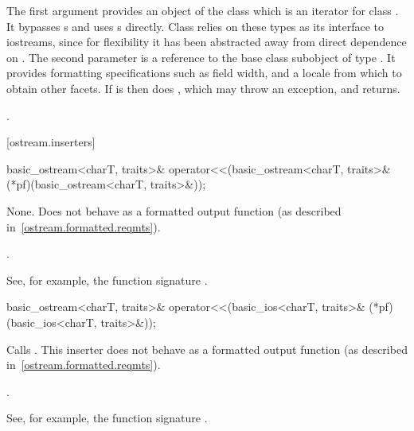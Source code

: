 \begin{itemdescr}
\pnum
The first argument provides an object of the
class which is an iterator for class .
It bypasses
s
and uses
s
directly.
Class
relies on these types as its
interface to iostreams, since for flexibility it has been abstracted
away from direct dependence on
.
The second parameter is a reference to the base class subobject of type
.
It provides formatting specifications such as field width, and
a locale from which to obtain other facets.
If
is
then does
,
which may throw an exception, and returns.

\pnum
\returns
{}.
\end{itemdescr}

[ostream.inserters]{}

%
\begin{itemdecl}
basic_ostream<charT, traits>&
  operator<<(basic_ostream<charT, traits>& (*pf)(basic_ostream<charT, traits>&));
\end{itemdecl}

\begin{itemdescr}
\pnum
\effects
None.
Does not behave as a formatted output function (as described
in~\ref{ostream.formatted.reqmts}).

\pnum
\returns
{}.
\begin{footnote}
See, for example, the function signature
%
.
\end{footnote}
\end{itemdescr}

%
\begin{itemdecl}
basic_ostream<charT, traits>&
  operator<<(basic_ios<charT, traits>& (*pf)(basic_ios<charT, traits>&));
\end{itemdecl}

\begin{itemdescr}
\pnum
\effects
Calls
.
This inserter does not
behave as a formatted output function (as described in~\ref{ostream.formatted.reqmts}).

\pnum
\returns
{}.
\begin{footnote}
See, for example, the function signature
%
.
\end{footnote}
\end{itemdescr}

